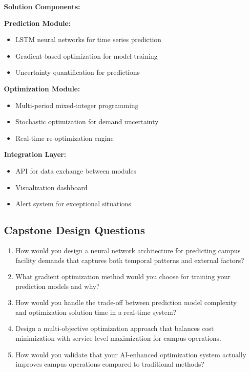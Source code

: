 \documentclass[
  letterpaper,
  DIV=11,
  numbers=noendperiod]{scrreprt}
\providecommand{\tightlist}{%
  \setlength{\itemsep}{0pt}\setlength{\parskip}{0pt}}
\begin{document}
\textbf{Solution Components:}

\textbf{Prediction Module:}

\begin{itemize}
\tightlist
\item
  LSTM neural networks for time series prediction
\item
  Gradient-based optimization for model training
\item
  Uncertainty quantification for predictions
\end{itemize}

\textbf{Optimization Module:}

\begin{itemize}
\tightlist
\item
  Multi-period mixed-integer programming
\item
  Stochastic optimization for demand uncertainty
\item
  Real-time re-optimization engine
\end{itemize}

\textbf{Integration Layer:}

\begin{itemize}
\tightlist
\item
  API for data exchange between modules
\item
  Visualization dashboard
\item
  Alert system for exceptional situations
\end{itemize}

\subsection{Capstone Design Questions}\label{capstone-design-questions}

\begin{enumerate}
\def\labelenumi{\arabic{enumi}.}
\item
  How would you design a neural network architecture for predicting
  campus facility demands that captures both temporal patterns and
  external factors?
\item
  What gradient optimization method would you choose for training your
  prediction models and why?
\item
  How would you handle the trade-off between prediction model complexity
  and optimization solution time in a real-time system?
\item
  Design a multi-objective optimization approach that balances cost
  minimization with service level maximization for campus operations.
\item
  How would you validate that your AI-enhanced optimization system
  actually improves campus operations compared to traditional methods?
\end{enumerate}
\end{document}
